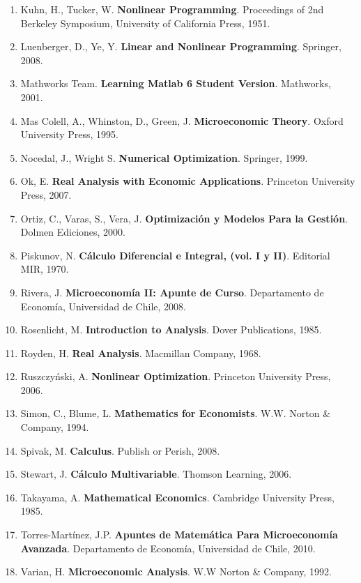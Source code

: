 \begin{enumerate}
\item Kuhn, H., Tucker, W. \textbf{Nonlinear Programming}. Proceedings of 2nd Berkeley Symposium, University of California Press, 1951.
\item Luenberger, D., Ye, Y. \textbf{Linear and Nonlinear Programming}. Springer, 2008.
\item Mathworks Team. \textbf{Learning Matlab 6 Student Version}. Mathworks, 2001. 
\item Mas Colell, A., Whinston, D., Green, J. \textbf{Microeconomic Theory}. Oxford University Press, 1995.
\item Nocedal, J., Wright S. \textbf{Numerical Optimization}. Springer, 1999.
\item Ok, E. \textbf{Real Analysis with Economic Applications}. Princeton University Press, 2007.
\item Ortiz, C., Varas, S., Vera, J. \textbf{Optimizaci\'on y Modelos Para la Gesti\'on}. Dolmen Ediciones, 2000.
\item Piskunov, N. \textbf{C\'alculo Diferencial e Integral, (vol. I y II)}. Editorial MIR, 1970.
\item Rivera, J. \textbf{Microeconom\'ia II: Apunte de Curso}. Departamento de Econom\'ia, Universidad de Chile, 2008.
\item Rosenlicht, M. \textbf{Introduction to Analysis}. Dover Publications, 1985.
\item Royden, H. \textbf{Real Analysis}. Macmillan Company, 1968.
\item Ruszczy\'nski, A. \textbf{Nonlinear Optimization}. Princeton University Press, 2006.
\item Simon, C., Blume, L. \textbf{Mathematics for Economists}. W.W. Norton \& Company, 1994. 
\item Spivak, M. \textbf{Calculus}. Publish or Perish, 2008.
\item Stewart, J. \textbf{C\'alculo Multivariable}. Thomson Learning, 2006.
\item Takayama, A. \textbf{Mathematical Economics}. Cambridge University Press, 1985.
\item Torres-Mart\'inez, J.P. \textbf{Apuntes de Matem\'atica Para Microeconom\'ia Avanzada}. Departamento de Econom\'ia, Universidad de Chile, 2010.
\item Varian, H. \textbf{Microeconomic Analysis}. W.W Norton \& Company, 1992.
\end{enumerate}
